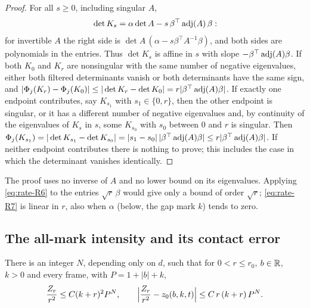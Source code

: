 \begin{proof}
For all $s\ge0$, including singular $A$,
\begin{equation}\label{eq:rate-affine}
\det K_s=\alpha\det A-s\,\beta^{\top}\operatorname{adj}(A)\,\beta :
\end{equation}
for invertible $A$ the right side is $\det A\,(\alpha-s\beta^{\top}A^{-1}\beta)$, and both sides are polynomials in the entries. Thus $\det K_s$ is affine in $s$ with slope $-\beta^{\top}\operatorname{adj}(A)\beta$. If both $K_0$ and $K_r$ are nonsingular with the same number of negative eigenvalues, either both filtered determinants vanish or both determinants have the same sign, and $|\Phi_j(K_r)-\Phi_j(K_0)|\le|\det K_r-\det K_0|=r|\beta^{\top}\operatorname{adj}(A)\beta|$. If exactly one endpoint contributes, say $K_{s_1}$ with $s_1\in\{0,r\}$, then the other endpoint is singular, or it has a different number of negative eigenvalues and, by continuity of the eigenvalues of $K_s$ in $s$, some $K_{s_0}$ with $s_0$ between $0$ and $r$ is singular. Then $\Phi_j(K_{s_1})=|\det K_{s_1}-\det K_{s_0}|=|s_1-s_0|\,|\beta^{\top}\operatorname{adj}(A)\beta|\le r|\beta^{\top}\operatorname{adj}(A)\beta|$. If neither endpoint contributes there is nothing to prove; this includes the case in which the determinant vanishes identically.
\end{proof}

The proof uses no inverse of $A$ and no lower bound on its eigenvalues. Applying \eqref{eq:rate-R6} to the entries $\sqrt r\,\beta$ would give only a bound of order $\sqrt r$; \eqref{eq:rate-R7} is linear in $r$, also when $\alpha$ (below, the gap mark $k$) tends to zero.

\subsection*{The all-mark intensity and its contact error}

\begin{lemma}\label{lem:rate-contact}
There is an integer $N$, depending only on $d$, such that for $0<r\le r_0$, $b\in\mathbb R$, $k>0$ and every frame, with $P=1+|b|+k$,
\begin{equation}\label{eq:rate-R10}
\frac{Z_r}{r^2}\le C(k+r)^2P^N,\qquad \Bigl|\frac{Z_r}{r^2}-z_0(b,k,t)\Bigr|\le C\,r\,(k+r)\,P^N .
\end{equation}
\end{lemma}

